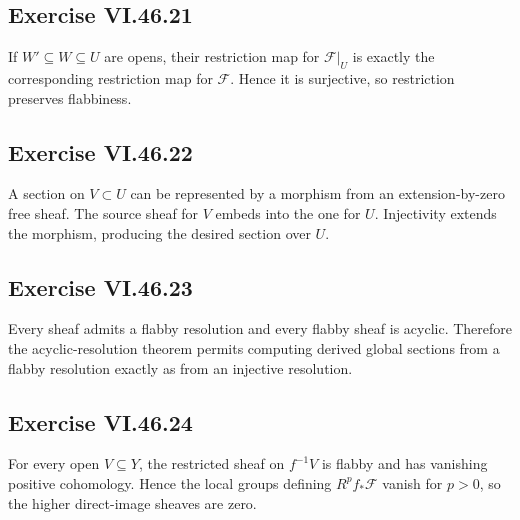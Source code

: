 \subsection*{Exercise VI.46.21}
\begin{solution}
If \(W'\subseteq W\subseteq U\) are opens, their restriction map for \(\mathcal F|_U\) is exactly the corresponding restriction map for \(\mathcal F\).  Hence it is surjective, so restriction preserves flabbiness.
\end{solution}

\subsection*{Exercise VI.46.22}
\begin{solution}
A section on \(V\subset U\) can be represented by a morphism from an extension-by-zero free sheaf.  The source sheaf for \(V\) embeds into the one for \(U\).  Injectivity extends the morphism, producing the desired section over \(U\).
\end{solution}

\subsection*{Exercise VI.46.23}
\begin{solution}
Every sheaf admits a flabby resolution and every flabby sheaf is acyclic.  Therefore the acyclic-resolution theorem permits computing derived global sections from a flabby resolution exactly as from an injective resolution.
\end{solution}

\subsection*{Exercise VI.46.24}
\begin{solution}
For every open \(V\subseteq Y\), the restricted sheaf on \(f^{-1}V\) is flabby and has vanishing positive cohomology.  Hence the local groups defining \(R^pf_*\mathcal F\) vanish for \(p>0\), so the higher direct-image sheaves are zero.
\end{solution}

